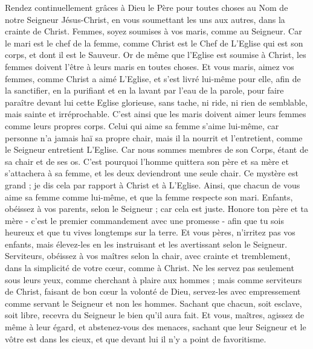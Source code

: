 \begin{multicols}{2}
Rendez continuellement grâces à Dieu le Père pour toutes choses au Nom de notre Seigneur Jésus-Christ,
en vous soumettant les uns aux autres, dans la crainte de Christ.
Femmes, soyez soumises à vos maris, comme au Seigneur.
Car le mari est le chef de la femme, comme Christ est le Chef de L’Eglise qui est son corps, et dont il est le Sauveur.
Or de même que l’Eglise est soumise à Christ, les femmes doivent l’être à leurs maris en toutes choses.
Et vous maris, aimez vos femmes, comme Christ a aimé L’Eglise, et s'est livré lui-même pour elle,
afin de la sanctifier, en la purifiant et en la lavant par l’eau de la parole,
pour faire paraître devant lui cette Eglise glorieuse, sans tache, ni ride, ni rien de semblable, mais sainte et irréprochable.
C’est ainsi que les maris doivent aimer leurs femmes comme leurs propres corps. Celui qui aime sa femme s'aime lui-même,
car personne n'a jamais haï sa propre chair, mais il la nourrit et l'entretient, comme le Seigneur entretient L’Eglise.
Car nous sommes membres de son Corps, étant de sa chair et de ses os.
C'est pourquoi l'homme quittera son père et sa mère et s’attachera à sa femme, et les deux deviendront une seule chair.
Ce mystère est grand ; je dis cela par rapport à Christ et à L’Eglise.
Ainsi, que chacun de vous aime sa femme comme lui-même, et que la femme respecte son mari.
\VerseOne{}Enfants, obéissez à vos parents, selon le Seigneur ; car cela est juste.
Honore ton père et ta mère - c’est le premier commandement avec une promesse -
afin que tu sois heureux et que tu vives longtemps sur la terre.
Et vous pères, n'irritez pas vos enfants, mais élevez-les en les instruisant et les avertissant selon le Seigneur.
Serviteurs, obéissez à vos maîtres selon la chair, avec crainte et tremblement, dans la simplicité de votre cœur, comme à Christ.
Ne les servez pas seulement sous leurs yeux, comme cherchant à plaire aux hommes ; mais comme serviteurs de Christ, faisant de bon cœur la volonté de Dieu,
servez-les avec empressement comme servant le Seigneur et non les hommes.
Sachant que chacun, soit esclave, soit libre, recevra du Seigneur le bien qu'il aura fait.
Et vous, maîtres, agissez de même à leur égard, et abstenez-vous des menaces, sachant que leur Seigneur et le vôtre est dans les cieux, et que devant lui il n'y a point de favoritisme.

\end{multicols}
